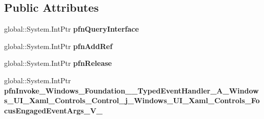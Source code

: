 \subsection*{Public Attributes}
\begin{DoxyCompactItemize}
\item 
\mbox{\label{struct_windows_1_1_foundation_1_1_typed_event_handler___a___windows___u_i___xaml___controls___cobd4a24aa41f7e9787f0e1d263ab457b2_aecd87d3f895dca65bdd7dd968df0f2b4}} 
global\+::\+System.\+Int\+Ptr {\bfseries pfn\+Query\+Interface}
\item 
\mbox{\label{struct_windows_1_1_foundation_1_1_typed_event_handler___a___windows___u_i___xaml___controls___cobd4a24aa41f7e9787f0e1d263ab457b2_ae1bd3d3357e7071625b21116148758c5}} 
global\+::\+System.\+Int\+Ptr {\bfseries pfn\+Add\+Ref}
\item 
\mbox{\label{struct_windows_1_1_foundation_1_1_typed_event_handler___a___windows___u_i___xaml___controls___cobd4a24aa41f7e9787f0e1d263ab457b2_a3d5dfc060141a310b00ab967740bc52d}} 
global\+::\+System.\+Int\+Ptr {\bfseries pfn\+Release}
\item 
\mbox{\label{struct_windows_1_1_foundation_1_1_typed_event_handler___a___windows___u_i___xaml___controls___cobd4a24aa41f7e9787f0e1d263ab457b2_a1ed2e1abdafee5279b6f2be720ba0fe9}} 
global\+::\+System.\+Int\+Ptr {\bfseries pfn\+Invoke\+\_\+\+Windows\+\_\+\+Foundation\+\_\+\+\_\+\+Typed\+Event\+Handler\+\_\+\+A\+\_\+\+Windows\+\_\+\+U\+I\+\_\+\+Xaml\+\_\+\+Controls\+\_\+\+Control\+\_\+j\+\_\+\+Windows\+\_\+\+U\+I\+\_\+\+Xaml\+\_\+\+Controls\+\_\+\+Focus\+Engaged\+Event\+Args\+\_\+\+V\+\_\+}
\end{DoxyCompactItemize}
